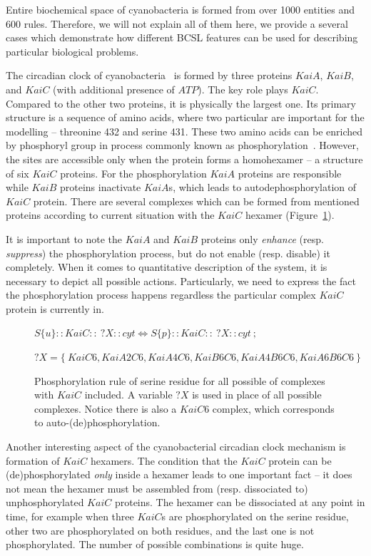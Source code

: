 \documentclass[12pt, twoside]{fithesis2} %
\begin{document}
Entire biochemical space of cyanobacteria is formed from over 1000 entities and 600 rules. Therefore, we will not explain all of them here, we provide a several cases which demonstrate how different BCSL features can be used for describing particular biological problems.

The circadian clock of cyanobacteria~\cite{CCR} is formed by three proteins $KaiA$, $KaiB$, and $KaiC$ (with additional presence of $ATP$). The key role plays $KaiC$. Compared to the other two proteins, it is physically the largest one. Its primary structure is a sequence of amino acids, where two particular are important for the modelling -- threonine 432 and serine 431. These two amino acids can be enriched by phosphoryl group in process commonly known as phosphorylation~\cite{cohen2002origins}. However, the sites are accessible only when the protein forms a homohexamer -- a structure of six $KaiC$ proteins. For the phosphorylation $KaiA$ proteins are responsible while $KaiB$ proteins inactivate $KaiA$s, which leads to autodephosphorylation of $KaiC$ protein. There are several complexes which can be formed from mentioned proteins according to current situation with the $KaiC$ hexamer (Figure~\ref{phospho_rule}).

It is important to note the $KaiA$ and $KaiB$ proteins only \emph{enhance} (resp. \emph{suppress}) the phosphorylation process, but do not enable (resp. disable) it completely. When it comes to quantitative description of the system, it is necessary to depict all possible actions. Particularly, we need to express the fact the phosphorylation process happens regardless the particular complex $KaiC$ protein is currently in. 

\begin{figure}[!h]
{\small
\begin{center}
$ S\{u\}::KaiC::~?X::cyt \Leftrightarrow S\{p\}::KaiC::~?X::cyt ~;~$

$ ?X = \{~KaiC6, KaiA2C6, KaiA4C6, KaiB6C6, KaiA4B6C6, KaiA6B6C6~\} $
\end{center}
}
\caption{Phosphorylation rule of serine residue for all possible of complexes with $KaiC$ included. A variable $?X$ is used in place of all possible complexes. Notice there is also a $KaiC6$ complex, which corresponds to auto-(de)phosphorylation.}\label{phospho_rule}
\end{figure}

Another interesting aspect of the cyanobacterial circadian clock mechanism is formation of $KaiC$ hexamers. The condition that the $KaiC$ protein can be (de)phosphorylated \emph{only} inside a hexamer leads to one important fact -- it does not mean the hexamer must be assembled from (resp. dissociated to) unphosphorylated $KaiC$ proteins. The hexamer can be dissociated at any point in time, for example when three $KaiC$s are phosphorylated on the serine residue, other two are phosphorylated on both residues, and the last one is not phosphorylated. The number of possible combinations is quite huge.
\end{document}
